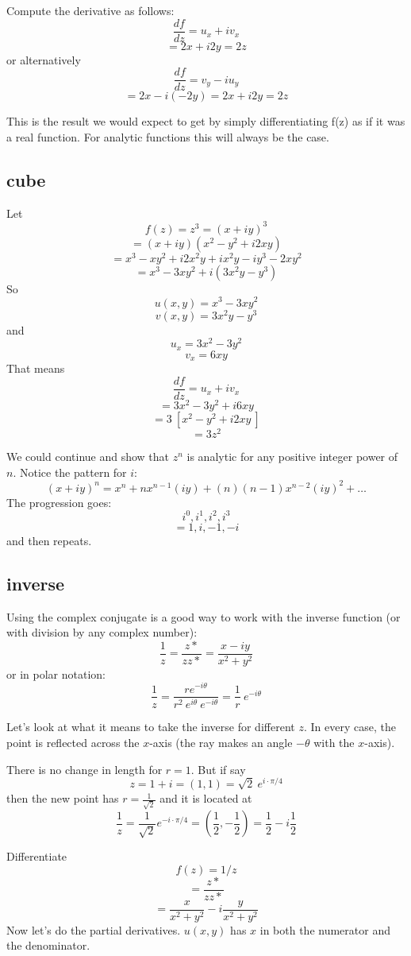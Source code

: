 \documentclass[11pt, oneside]{article}   	%
\begin{document}
Compute the derivative as follows:
\[ \frac{df}{dz} = u_x + i v_x \]
\[ = 2x + i 2y = 2z \]
or alternatively
\[ \frac{df}{dz} = v_y - i u_y \]
\[ = 2x - i (-2y) = 2x + i2y = 2z \]

This is the result we would expect to get by simply differentiating f(z) as if it was a real function. For analytic functions this will always be the case.

\subsection*{cube}
Let
\[ f(z) = z^3 = (x + iy)^3 \]
\[ = (x + iy)(x^2 - y^2 + i2xy) \]
\[ = x^3 -xy^2 + i2x^2y + ix^2y -iy^3 - 2xy^2 \]
\[ = x^3 - 3xy^2 + i(3x^2y - y^3) \]
So
\[ u(x,y) = x^3 - 3xy^2 \]
\[ v(x,y) = 3x^2y - y^3 \]
and
\[ u_x = 3x^2 - 3y^2 \]
\[ v_x = 6xy \]
That means
\[ \frac{df}{dz} = u_x + i v_x \]
\[ = 3x^2 - 3y^2 + i 6xy \]
\[ = 3 \ [ x^2 - y^2 + i2xy \ ] \]
\[ = 3z^2 \]

We could continue and show that $z^n$ is analytic for any positive integer power of $n$.
Notice the pattern for $i$:
\[ (x + iy)^n = x^n + nx^{n-1}(iy) + (n)(n-1)x^{n-2}(iy)^2 + \dots \]
The progression goes:
\[ i^0, i^1, i^2, i^3 \]
\[ = 1, i, -1, -i \]
and then repeats.

\subsection*{inverse}
Using the complex conjugate is a good way to work with the inverse function (or with division by any complex number):
\[ \frac{1}{z} = \frac{z*}{zz*} = \frac{x - iy}{x^2 + y^2} \]
or in polar notation:
\[  \frac{1}{z} =  \frac{r e^{-i \theta}}{r^2 \ e^{i \theta} \ e^{-i \theta}} = \frac{1}{r} \ e^{-i \theta} \]

Let's look at what it means to take the inverse for different $z$.  In every case, the point is reflected across the $x$-axis (the ray makes an angle $- \theta$ with the $x$-axis).  

There is no change in length for $r=1$.  But if say 
\[ z = 1 + i = (1,1) = \sqrt{2} \ e^{i \cdot \pi/4} \]
then the new point has $r = \frac{1}{\sqrt{2}}$ and it is located at
\[ \frac{1}{z} = \frac{1}{\sqrt{2}} e^{-i \cdot \pi/4} = (\frac{1}{2},- \frac{1}{2}) = \frac{1}{2} - i \frac{1}{2}\]

Differentiate
\[ f(z) = 1/z \]
\[ = \frac{z*}{zz*} \]
\[ = \frac{x}{x^2 + y^2} - i\frac{y}{x^2 + y^2} \]
Now let's do the partial derivatives.  $u(x,y)$ has $x$ in both the numerator and the denominator.
\end{document}
